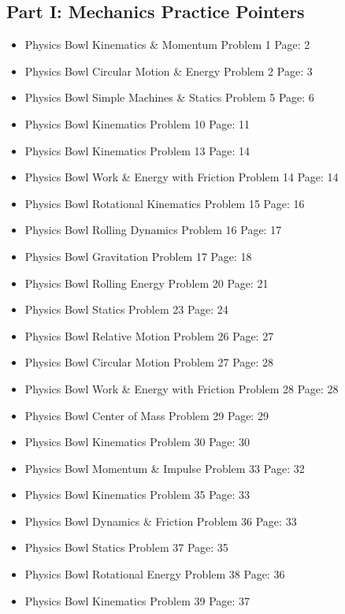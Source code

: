 ﻿\documentclass[12pt,a4paper]{article}
\begin{document}
\subsection*{Part I: Mechanics Practice Pointers}
\begin{itemize}[leftmargin=*]
  \item Physics Bowl Kinematics \& Momentum Problem 1 Page: 2
  \item Physics Bowl Circular Motion \& Energy Problem 2 Page: 3
  \item Physics Bowl Simple Machines \& Statics Problem 5 Page: 6
  \item Physics Bowl Kinematics Problem 10 Page: 11
  \item Physics Bowl Kinematics Problem 13 Page: 14
  \item Physics Bowl Work \& Energy with Friction Problem 14 Page: 14
  \item Physics Bowl Rotational Kinematics Problem 15 Page: 16
  \item Physics Bowl Rolling Dynamics Problem 16 Page: 17
  \item Physics Bowl Gravitation Problem 17 Page: 18
  \item Physics Bowl Rolling Energy Problem 20 Page: 21
  \item Physics Bowl Statics Problem 23 Page: 24
  \item Physics Bowl Relative Motion Problem 26 Page: 27
  \item Physics Bowl Circular Motion Problem 27 Page: 28
  \item Physics Bowl Work \& Energy with Friction Problem 28 Page: 28
  \item Physics Bowl Center of Mass Problem 29 Page: 29
  \item Physics Bowl Kinematics Problem 30 Page: 30
  \item Physics Bowl Momentum \& Impulse Problem 33 Page: 32
  \item Physics Bowl Kinematics Problem 35 Page: 33
  \item Physics Bowl Dynamics \& Friction Problem 36 Page: 33
  \item Physics Bowl Statics Problem 37 Page: 35
  \item Physics Bowl Rotational Energy Problem 38 Page: 36
  \item Physics Bowl Kinematics Problem 39 Page: 37
\end{itemize}
\end{document}
